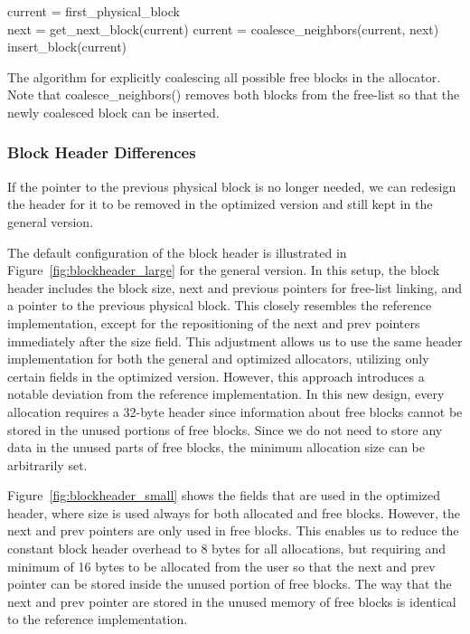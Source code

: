 \begin{algorithm}[H]
current = first\_physical\_block\\
 {
next = get\_next\_block(current)\;
 {
    current = coalesce\_neighbors(current, next)\;
    insert\_block(current)\;
}
}
\label{algorithm:coalesce_blocks}
\caption{The algorithm for explicitly coalescing all possible free blocks in the allocator. Note that coalesce\_neighbors() removes both blocks from the free-list so that the newly coalesced block can be inserted.}
\end{algorithm}

\subsubsection{Block Header Differences}

If the pointer to the previous physical block is no longer needed, we can redesign the header for it to be removed in the optimized version and still kept in the general version.

The default configuration of the block header is illustrated in Figure~\ref{fig:blockheader_large} for the general version. In this setup, the block header includes the block size, next and previous pointers for free-list linking, and a pointer to the previous physical block. This closely resembles the reference implementation, except for the repositioning of the next and prev pointers immediately after the size field. This adjustment allows us to use the same header implementation for both the general and optimized allocators, utilizing only certain fields in the optimized version. However, this approach introduces a notable deviation from the reference implementation. In this new design, every allocation requires a 32-byte header since information about free blocks cannot be stored in the unused portions of free blocks. Since we do not need to store any data in the unused parts of free blocks, the minimum allocation size can be arbitrarily set.


Figure~\ref{fig:blockheader_small} shows the fields that are used in the optimized header, where size is used always for both allocated and free blocks. However, the next and prev pointers are only used in free blocks. This enables us to reduce the constant block header overhead to 8 bytes for all allocations, but requiring and minimum of 16 bytes to be allocated from the user so that the next and prev pointer can be stored inside the unused portion of free blocks. The way that the next and prev pointer are stored in the unused memory of free blocks is identical to the reference implementation.

